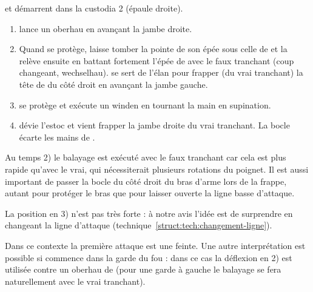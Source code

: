 \begin{technique}[Liegniczer 3]
\label{épée-bocle:tech:liegniczer:3}

\A et \D démarrent dans la custodia 2 (épaule droite).

\begin{enumerate}
	\item \A lance un oberhau en avançant la jambe droite.
	
	\item Quand \D se protège, \A laisse tomber la pointe de son épée sous celle de \D et la relève ensuite en battant fortement l'épée de \D avec le faux tranchant (coup changeant, wechselhau).
		\A se sert de l'élan pour frapper (du vrai tranchant) la tête de \D du côté droit en avançant la jambe gauche.
	
	\item \D se protège et \A exécute un winden en tournant la main en supination.
	
	\item {}
		\D dévie l'estoc et \A vient frapper la jambe droite du vrai tranchant.
		La bocle écarte les mains de \D.
\end{enumerate}

Au temps 2) le balayage est exécuté avec le faux tranchant car cela est plus rapide qu'avec le vrai, qui nécessiterait plusieurs rotations du poignet.
Il est aussi important de passer la bocle du côté droit du bras d'arme lors de la frappe, autant pour protéger le bras que pour laisser ouverte la ligne basse d'attaque.

La position en 3) n'est pas très forte : à notre avis l'idée est de surprendre en changeant la ligne d'attaque (technique~\ref{struct:tech:changement-ligne}).

Dans ce contexte la première attaque est une feinte.
Une autre interprétation est possible si \A commence dans la garde du fou : dans ce cas la déflexion en 2) est utilisée contre un oberhau de \D (pour une garde à gauche le balayage se fera naturellement avec le vrai tranchant).

\end{technique}


